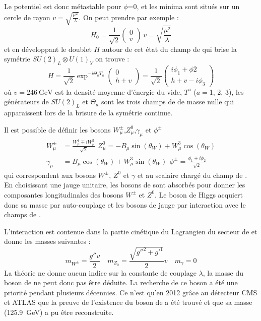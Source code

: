Le potentiel est donc métastable pour $\phi$=0, et les minima sont situés sur un cercle de rayon $v=\sqrt{\frac{\mu^{2}}{\lambda}}$. On peut prendre par exemple :
\begin{equation}
H_{0}=\frac{1}{\sqrt{2}}\begin{pmatrix} 
0\\
v
\end{pmatrix} \, v=\sqrt{\frac{\mu^{2}}{\lambda}}
\end{equation}
et en développant le doublet $H$ autour de cet état du champ de  qui brise la symétrie $SU(2)_{L}\otimes U(1)_{Y}$ on trouve : 
\begin{equation}
H=\frac{1}{\sqrt{2}}\exp^{-i\Theta_{a}T_{a}}\begin{pmatrix} 
0\\
h+v
\end{pmatrix}=\frac{1}{\sqrt{2}}\begin{pmatrix} 
i\phi_{1}+\phi{2}\\
h+v-i\phi_{3}
\end{pmatrix}
\end{equation}
où $v=\SI{246}{\giga\eV}$ est la densité moyenne d'énergie du vide, $T^{a}$ ($a=$\num{1}, \num{2}, \num{3}), les générateurs de $SU(2)_{L}$ et $\Theta_{a}$ sont les trois champs de  de masse nulle qui apparaissent lors de la brisure de la symétrie continue.

Il est possible de définir les bosons $W_{\mu}^{\pm}$,$Z_{\mu}^{0}$,$\gamma_{\mu}$ et $\phi^{\pm}$ 
\begin{equation}
\begin{split}
W_{\mu}^{\pm}&=\frac{W_{\mu}^{1}\mp iW_{\mu}^{2}}{\sqrt{2}}\, \ Z_{\mu}^{0}=-B_{\mu}\sin(\theta_{W})+W_{\mu}^{3}\cos(\theta_{W})\\
\gamma_{\mu}&=B_{\mu}\cos(\theta_{W})+W_{\mu}^{3}\sin(\theta_{W})\, \ \phi^{\pm}=\frac{\phi_{1}\mp i\phi_{2}}{\sqrt{2}}
\end{split}
\end{equation}
qui correspondent aux bosons $W^{\pm}$, $Z^{0}$ et $\gamma$ et au scalaire chargé du champ de . En choisissant une jauge unitaire, les bosons de  sont absorbés pour donner les composantes longitudinales des bosons $W^{\pm}$ et $Z^{0}$. Le boson de Higgs acquiert donc sa masse par auto-couplage et les bosons de jauge par interaction avec le champs de .

L'interaction est contenue dans la partie cinétique du Lagrangien du secteur de  et donne les masses suivantes : 
\begin{equation}
m_{W^{\pm}}=\frac{g''v}{2} \quad m_{Z_{0}}=\frac{\sqrt{g''^{2}+g'^{1}}}{2}v \quad m_{\gamma}=0 
\end{equation} 
La théorie ne donne aucun indice sur la constante de couplage $\lambda$, la masse du boson de  ne peut donc pas être déduite. La recherche de ce boson a été une priorité pendant plusieurs décennies. Ce n'est qu'en \num{2012} grâce au détecteur CMS et ATLAS que la preuve de l'existence du boson de  a été trouvé et que sa masse (\SI{125.9}{\giga\eV}) a pu être reconstruite. 

